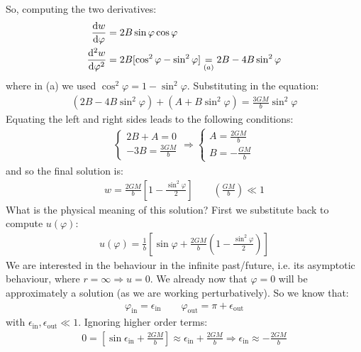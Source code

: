 \documentclass[../template.tex]{subfiles}
\begin{document}
So, computing the two derivatives:
\begin{align*}
    \dv{w}{\varphi} &= 2B\sin\varphi\cos\varphi\\
    \dv[2]{w}{\varphi} &= 2B [\cos^2 \varphi - \sin^2 \varphi] \underset{(a)}{=} 2B -4B\sin^2 \varphi  
\end{align*}
where in (a) we used $\cos^2 \varphi = 1-\sin^2 \varphi$. Substituting in the equation:
\begin{align*}
    (2B-4B\sin^2\varphi) + (A + B \sin^2 \varphi) = \frac{3GM}{b} \sin^2 \varphi 
\end{align*} 
Equating the left and right sides leads to the following conditions:
\begin{align*}
    \begin{cases}
        2B + A = 0\\
        -3B = \frac{3GM}{b} 
    \end{cases}
\Rightarrow \begin{cases}
    A = \frac{2GM}{b}\\
    B = -\frac{GM}{b}  
\end{cases}
\end{align*}
and so the final solution is:
\begin{align*}
    w = \frac{2GM}{b}\left[1-\frac{\sin^2 \varphi}{2} \right] \qquad \left(\frac{GM}{b} \right) \ll 1
\end{align*}
What is the physical meaning of this solution? First we substitute back to compute $u(\varphi)$:
\begin{align*}
    u(\varphi) = \frac{1}{b} \left[\sin\varphi + \frac{2GM}{b} \left(1- \frac{\sin^2 \varphi}{2} \right) \right] 
\end{align*} 
We are interested in the behaviour in the infinite past/future, i.e. its asymptotic behaviour, where $r= \infty \Rightarrow u = 0$. We already now that $\varphi = 0$ will be approximately a solution (as we are working perturbatively). So we know that:
\begin{align*}
    \varphi_{\mathrm{in} } = \epsilon_\mathrm{in} \qquad \varphi_{\mathrm{out} } = \pi + \epsilon_{\mathrm{out} } 
\end{align*}  
with $\epsilon_{\mathrm{in} }, \epsilon_{\mathrm{out} } \ll 1$. Ignoring higher order terms:
\begin{align*}
    0 = \left[\sin \epsilon_{\mathrm{in} } + \frac{2GM}{b} \right] \approx \epsilon_{\mathrm{in} } + \frac{2GM}{b} \Rightarrow \epsilon_{\mathrm{in} } \approx -\frac{2GM}{b} 
\end{align*}
\end{document}
